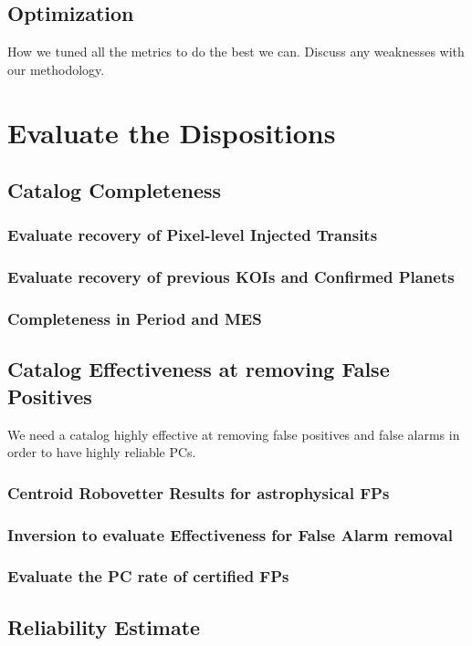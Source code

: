 \documentclass[onecolumn]{aastex6}
\begin{document}
\subsection{Optimization}
How we tuned all the metrics to do the best we can.
Discuss any weaknesses with our methodology.

\section{Evaluate the Dispositions}

\subsection{Catalog Completeness}
\subsubsection{Evaluate recovery of Pixel-level Injected Transits}
\subsubsection{Evaluate recovery of previous KOIs and Confirmed Planets}
\subsubsection{Completeness in Period and MES}

\subsection{Catalog Effectiveness at removing False Positives}
We need a catalog highly effective at removing false positives and false alarms in order to have highly reliable PCs.
\subsubsection{Centroid Robovetter Results for astrophysical FPs}
\subsubsection{Inversion to evaluate Effectiveness for False Alarm removal}
\subsubsection{Evaluate the PC rate of certified FPs}
\subsection{Reliability Estimate}
\end{document}
